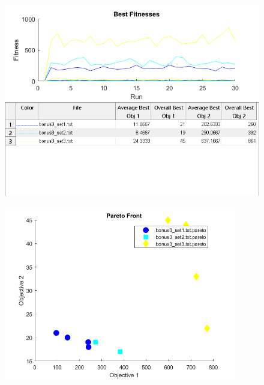 \documentclass[11pt]{article}
\begin{document}
\begin{figure}[H]
	\centering
  \includegraphics[width=5in]{assn1d_bonus3_bestfitness.png}
  \label{fig:bonus3_best}
\end{figure}

\begin{figure}[H]
	\centering
  \includegraphics[width=4in]{assn1d_bonus3_pareto.png}
  \label{fig:bonus3_pareto}
\end{figure}
\end{document}
